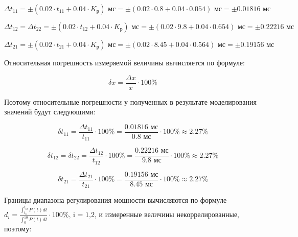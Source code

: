 \begin{displaymath}
	\Delta t_{11} = \pm \left( 0.02 \cdot t_{11} + 0.04 \cdot K_{\text{р}} \right) \text{ мс} = \pm \left( 0.02 \cdot 0.8 + 0.04 \cdot 0.054 \right) \text{ мс} = \pm 0.01816 \text{ мс} 
\end{displaymath}

\begin{displaymath}
	\Delta t_{12} = \Delta t_{22} = \pm \left( 0.02 \cdot t_{12} + 0.04 \cdot K_{\text{р}} \right) \text{ мс} = \pm \left( 0.02 \cdot 9.8 + 0.04 \cdot 0.654 \right) \text{ мс} = \pm 0.22216 \text{ мс}
\end{displaymath}

\begin{displaymath}
	\Delta t_{21} = \pm \left( 0.02 \cdot t_{21} + 0.04 \cdot K_{\text{р}} \right) \text{ мс} = \pm \left( 0.02 \cdot 8.45 + 0.04 \cdot 0.564 \right) \text{ мс} = \pm 0.19156 \text{ мс}
\end{displaymath}

Относительная погрешность измеряемой величины вычисляется по формуле:

\begin{equation}
	\delta x = \frac{\Delta x}{x} \cdot 100\%
\end{equation}

Поэтому относительные погрешности у полученных в результате моделирования значений будут следующими:

\begin{displaymath}
	\delta t_{11} = \frac{\Delta t_{11}}{t_{11}} \cdot 100\% = \frac{0.01816 \text{ мс}}{0.8 \text{ мс}} \cdot 100\% \approx 2.27 \%
\end{displaymath}

\begin{displaymath}
	\delta t_{12} = \delta t_{22} = \frac{\Delta t_{12}}{t_{12}} \cdot 100\% = \frac{0.22216 \text{ мс}}{9.8 \text{ мс}} \cdot 100\% \approx 2.27 \%
\end{displaymath}

\begin{displaymath}
	\delta t_{21} = \frac{\Delta t_{21}}{t_{21}} \cdot 100\% = \frac{0.19156 \text{ мс}}{8.45 \text{ мс}} \cdot 100\% \approx 2.27 \%
\end{displaymath}

Границы диапазона регулирования мощности вычисляются по формуле\\\noindent $d_i = \frac{\int_{t_{i1}}^{t_{i2}} P(t) dt}{\int_{0}^{10} P(t) dt} \cdot 100\% \text{, i = 1,2}$, и измеренные величины некоррелированные, поэтому:

